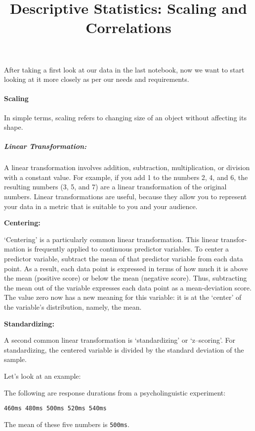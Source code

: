 \documentclass[
]{article}
\title{Descriptive Statistics: Scaling and Correlations}
\author{}
\date{\vspace{-2.5em}}
\begin{document}
\maketitle

After taking a first look at our data in the last notebook, now we want
to start looking at it more closely as per our needs and requirements.

\paragraph{Scaling}\label{scaling}

In simple terms, scaling refers to changing size of an object without
affecting its shape.

\subparagraph{Linear Transformation:}\label{linear-transformation}

A linear transformation involves addition, subtraction, multiplication,
or division with a constant value. For example, if you add 1 to the
numbers 2, 4, and 6, the resulting numbers (3, 5, and 7) are a linear
transformation of the original numbers. Linear transformations are
useful, because they allow you to represent your data in a metric that
is suitable to you and your audience.

\textbf{Centering:}

`Centering' is a particularly common linear transformation. This linear
transfor- mation is frequently applied to continuous predictor
variables. To center a predictor variable, subtract the mean of that
predictor variable from each data point. As a result, each data point is
expressed in terms of how much it is above the mean (positive score) or
below the mean (negative score). Thus, subtracting the mean out of the
variable expresses each data point as a mean-deviation score. The value
zero now has a new meaning for this variable: it is at the `center' of
the variable's distribution, namely, the mean.

\textbf{Standardizing:}

A second common linear transformation is `standardizing' or
`z--scoring'. For standardizing, the centered variable is divided by the
standard deviation of the sample.

Let's look at an example:

The following are response durations from a psycholinguistic experiment:

\texttt{460ms\ 480ms\ 500ms\ 520ms\ 540ms}

The mean of these five numbers is \texttt{500ms}.
\end{document}
